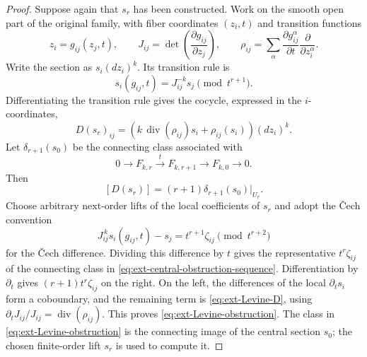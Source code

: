 \documentclass[11pt,a4paper]{article}
\theoremstyle{definition}\newtheorem{definition}[theorem]{Definition}
\theoremstyle{remark}\newtheorem*{remark}{Remark}
\begin{document}
\begin{proof}
Suppose again that $s_r$ has been constructed. Work on the smooth open
part of the original family, with fiber coordinates $(z_i,t)$ and
transition functions
\[
 z_i=g_{ij}(z_j,t),\qquad
 J_{ij}=\det\left(\frac{\partial g_{ij}}{\partial z_j}\right),\qquad
 \rho_{ij}=\sum_\alpha
 \frac{\partial g_{ij}^{\alpha}}{\partial t}
 \frac{\partial}{\partial z_i^\alpha}.
\]
Write the section as $s_i(dz_i)^k$. Its transition rule is
\[
 s_i(g_{ij},t)=J_{ij}^{-k}s_j\pmod {t^{r+1}}.
\]
Differentiating the transition rule gives the cocycle, expressed in
the $i$-coordinates,
\begin{equation}\label{eq:ext-Levine-D}
 D(s_r)_{ij}
 =\left(k\,\operatorname{div}(\rho_{ij})s_i+\rho_{ij}(s_i)\right)(dz_i)^k.
\end{equation}
Let $\delta_{r+1}(s_0)$ be the connecting class associated with
\begin{equation}\label{eq:ext-central-obstruction-sequence}
 0\longrightarrow F_{k,r}\xrightarrow{\ t\ }F_{k,r+1}
 \longrightarrow F_{k,0}\longrightarrow0.
\end{equation}
Then
\begin{equation}\label{eq:ext-Levine-obstruction}
 [D(s_r)]=(r+1)\delta_{r+1}(s_0)|_{U_r}.
\end{equation}
Choose arbitrary next-order lifts of the local coefficients of $s_r$
and adopt the \v{C}ech convention
\[
 J_{ij}^{\,k}s_i(g_{ij},t)-s_j=t^{r+1}\zeta_{ij}
 \pmod {t^{r+2}}
\]
for the \v{C}ech difference.
Dividing this difference by $t$ gives the representative
$t^r\zeta_{ij}$ of the connecting class in
\eqref{eq:ext-central-obstruction-sequence}.
Differentiation by $\partial_t$ gives $(r+1)t^r\zeta_{ij}$ on the right.
On the left, the differences of the local $\partial_t s_i$ form a
coboundary, and the remaining term is
\eqref{eq:ext-Levine-D}, using
$\partial_t J_{ij}/J_{ij}=\operatorname{div}(\rho_{ij})$.
This proves \eqref{eq:ext-Levine-obstruction}.
The class in \eqref{eq:ext-Levine-obstruction} is the connecting image of
the central section $s_0$; the chosen finite-order lift $s_r$ is used to
compute it.


\end{proof}
\end{document}
